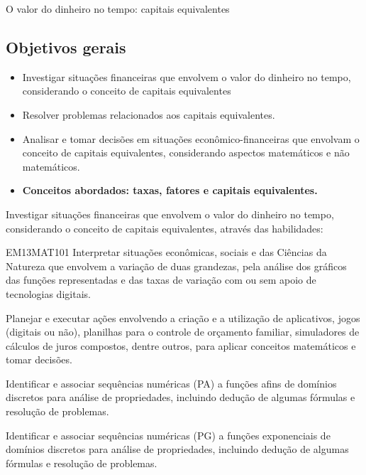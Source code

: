 \begin{paginatexto}{O valor do dinheiro no tempo: capitais equivalentes}

\subsection*{Objetivos gerais}

\begin{itemize}
\item Investigar situações financeiras que envolvem o valor do dinheiro no tempo, considerando o conceito de capitais equivalentes 
\item Resolver problemas relacionados aos capitais equivalentes.
\item Analisar e tomar decisões em situações econômico-financeiras que envolvam o conceito de capitais equivalentes, considerando aspectos matemáticos e não matemáticos.

\item \textbf{Conceitos abordados: taxas, fatores e capitais equivalentes.}
\end{itemize}


Investigar situações financeiras que envolvem o valor do dinheiro no tempo, considerando o conceito de capitais equivalentes, através das habilidades:

\begin{habilities}{EM13MAT101}
 Interpretar situações econômicas, sociais e das Ciências da Natureza
que envolvem a variação de duas grandezas, pela análise dos gráficos das funções representadas e das taxas de variação com ou sem apoio de tecnologias digitais.

Planejar e executar ações envolvendo a criação e a utilização de aplicativos, jogos (digitais ou não), planilhas para o controle de orçamento familiar, simuladores de cálculos de juros compostos, dentre outros, para aplicar conceitos matemáticos e tomar decisões. 

Identificar e associar sequências numéricas (PA) a funções afins de domínios discretos para análise de propriedades, incluindo dedução de algumas fórmulas e resolução de problemas.

Identificar e associar sequências numéricas (PG) a funções exponenciais de domínios discretos para análise de propriedades, incluindo dedução de algumas fórmulas e resolução de problemas.
\end{habilities}


\end{paginatexto}
